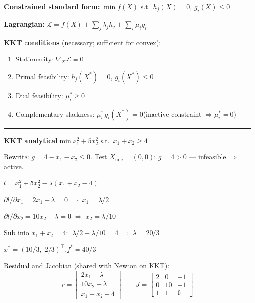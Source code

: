 \documentclass[10pt]{article}
\begin{document}
\noindent
\begin{minipage}[t]{0.49\textwidth}\vspace{0pt}

  \textbf{Constrained standard form:}
  $\min f(X)$ s.t.\ $h_j(X)=0$,\; $g_i(X)\le0$

  \textbf{Lagrangian:}
  $\mathcal{L}=f(X)+\sum_j\lambda_j h_j+\sum_i\mu_i g_i$

  \medskip
  \textbf{KKT conditions} (necessary; sufficient for convex):
  \begin{enumerate}\setlength\itemsep{0pt}
    \item Stationarity: $\nabla_X\mathcal{L}=0$
    \item Primal feasibility: $h_j(X^*)=0$,\; $g_i(X^*)\le0$
    \item Dual feasibility: $\mu_i^*\ge0$
    \item Complementary slackness: $\mu_i^*\,g_i(X^*)=0$\newline (inactive constraint $\Rightarrow\mu_i^*=0$)
  \end{enumerate}

  \medskip\hrule\medskip

  \textbf{KKT analytical}\quad $\min x_1^2+5x_2^2$ s.t.\ $x_1+x_2\ge4$

  Rewrite: $g=4-x_1-x_2\le0$.\quad
  Test $X_\text{unc}=(0,0)$: $g=4>0$ — infeasible $\Rightarrow$ active.

  $l=x_1^2+5x_2^2-\lambda(x_1+x_2-4)$

  $\partial l/\partial x_1=2x_1-\lambda=0 \;\Rightarrow\; x_1=\lambda/2$

  $\partial l/\partial x_2=10x_2-\lambda=0 \;\Rightarrow\; x_2=\lambda/10$

  Sub into $x_1+x_2=4$: $\;\lambda/2+\lambda/10=4\;\Rightarrow\;\lambda=20/3$

  $x^*=(10/3,\;2/3)^\top$,\quad $f^*=40/3$

  \medskip
  Residual and Jacobian (shared with Newton on KKT):
  \[
    r=\begin{bmatrix}2x_1-\lambda\\10x_2-\lambda\\x_1+x_2-4\end{bmatrix}
    \qquad
    J=\begin{bmatrix}2&0&-1\\0&10&-1\\1&1&0\end{bmatrix}
  \]

\end{minipage}\hfill
\end{document}
